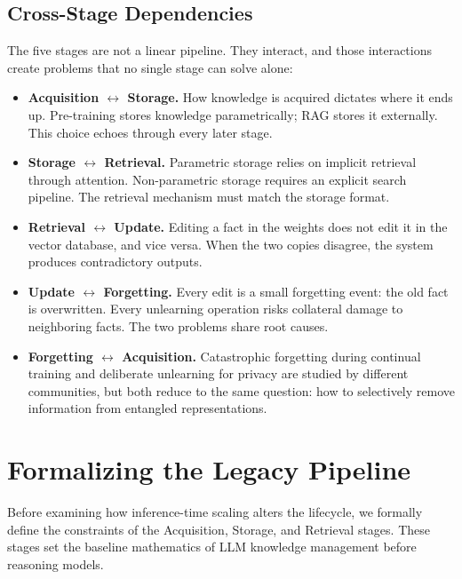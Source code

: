 \documentclass[10pt]{article}
\begin{document}
\subsection{Cross-Stage Dependencies}

The five stages are not a linear pipeline. They interact, and those interactions create problems that no single stage can solve alone:

\begin{itemize}[leftmargin=*]
  \item \textbf{Acquisition $\leftrightarrow$ Storage.} How knowledge is acquired dictates where it ends up. Pre-training stores knowledge parametrically; RAG stores it externally. This choice echoes through every later stage.
  \item \textbf{Storage $\leftrightarrow$ Retrieval.} Parametric storage relies on implicit retrieval through attention. Non-parametric storage requires an explicit search pipeline. The retrieval mechanism must match the storage format.
  \item \textbf{Retrieval $\leftrightarrow$ Update.} Editing a fact in the weights does not edit it in the vector database, and vice versa. When the two copies disagree, the system produces contradictory outputs.
  \item \textbf{Update $\leftrightarrow$ Forgetting.} Every edit is a small forgetting event: the old fact is overwritten. Every unlearning operation risks collateral damage to neighboring facts. The two problems share root causes.
  \item \textbf{Forgetting $\leftrightarrow$ Acquisition.} Catastrophic forgetting during continual training and deliberate unlearning for privacy are studied by different communities, but both reduce to the same question: how to selectively remove information from entangled representations.
\end{itemize}

\section{Formalizing the Legacy Pipeline}
\label{sec:legacy_pipeline}
\label{sec:retrieval}

Before examining how inference-time scaling alters the lifecycle, we formally define the constraints of the Acquisition, Storage, and Retrieval stages. These stages set the baseline mathematics of LLM knowledge management before reasoning models.
\end{document}
